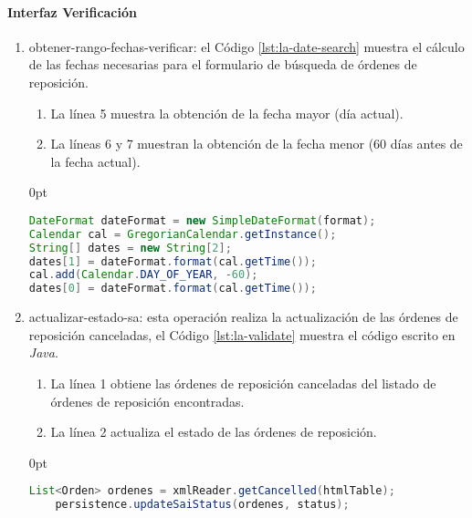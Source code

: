 \paragraph{\indent Interfaz Verificación}
\begin{enumerate}
	\item obtener-rango-fechas-verificar: el Código \ref{lst:la-date-search} muestra el cálculo de las fechas necesarias para el formulario de búsqueda de órdenes de reposición.
	\begin{enumerate}
		\item La línea 5 muestra la obtención de la fecha mayor (día actual).
		\item La líneas 6 y 7 muestran la obtención de la fecha menor (60 días antes de la fecha actual).
	\end{enumerate}
	\begin{adjustwidth}{\listingfixwidth}{0pt}
	\begin{lstlisting}[language=Java, caption={Cálculo del rango de fechas para buscar órdenes de reposición canceladas.}, captionpos=b, label={lst:la-date-search}]
DateFormat dateFormat = new SimpleDateFormat(format);
Calendar cal = GregorianCalendar.getInstance();
String[] dates = new String[2];
dates[1] = dateFormat.format(cal.getTime());
cal.add(Calendar.DAY_OF_YEAR, -60);
dates[0] = dateFormat.format(cal.getTime());
	\end{lstlisting}
	\end{adjustwidth}

	\item actualizar-estado-sa: esta operación realiza la actualización de las órdenes de reposición canceladas, el Código \ref{lst:la-validate} muestra el código escrito en \textit{Java}.
	\begin{enumerate}
		\item La línea 1 obtiene las órdenes de reposición canceladas del listado de órdenes de reposición encontradas.
		\item La línea 2 actualiza el estado de las órdenes de reposición.
	\end{enumerate}
	\begin{adjustwidth}{\listingfixwidth}{0pt}
	\begin{lstlisting}[language=Java, caption={Actualización de órdenes de reposición canceladas.}, captionpos=b, label={lst:la-validate}]
	List<Orden> ordenes = xmlReader.getCancelled(htmlTable);
	persistence.updateSaiStatus(ordenes, status);
	\end{lstlisting}
	\end{adjustwidth}
\end{enumerate}
